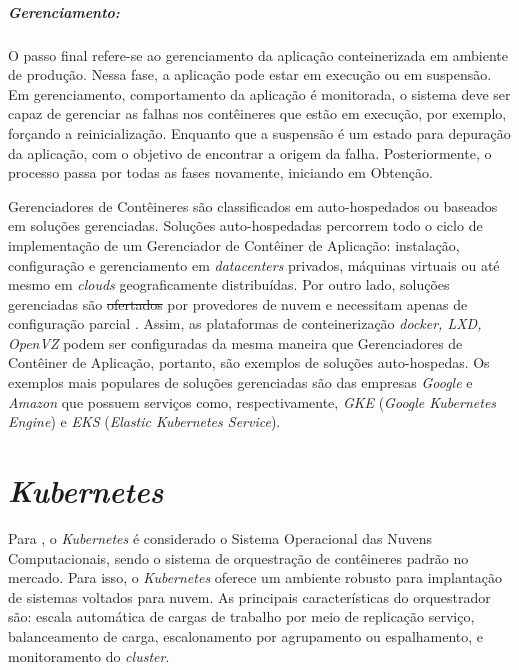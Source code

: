 \documentclass[
	12pt,				%
	openright,			%
	oneside,			%
	a4paper,			%
	brazil				%
	]{abntex2}
\providecommand{\DIFaddtex}[1]{{\protect\color{blue}\uwave{#1}}} %
\providecommand{\DIFdeltex}[1]{{\protect\color{red}\sout{#1}}}                      %
\providecommand{\DIFaddbegin}{} %
\providecommand{\DIFaddend}{} %
\providecommand{\DIFdelbegin}{} %
\providecommand{\DIFdelend}{} %
\providecommand{\DIFadd}[1]{\texorpdfstring{\DIFaddtex{#1}}{#1}} %
\providecommand{\DIFdel}[1]{\texorpdfstring{\DIFdeltex{#1}}{}} %
\newcommand{\DIFscaledelfig}{0.5}
\newlength{\DIFdelgraphicswidth} %
\newlength{\DIFdelgraphicsheight} %
\newcommand{\DIFaddincludegraphics}[2][]{{\color{blue}\fbox{\DIFOincludegraphics[#1]{#2}}}} %
\newcommand{\DIFdelincludegraphics}[2][]{%
\sbox{\DIFdelgraphicsbox}{\DIFOincludegraphics[#1]{#2}}%
\settoboxwidth{\DIFdelgraphicswidth}{\DIFdelgraphicsbox} %
\settoboxtotalheight{\DIFdelgraphicsheight}{\DIFdelgraphicsbox} %
\scalebox{\DIFscaledelfig}{%
\parbox[b]{\DIFdelgraphicswidth}{\usebox{\DIFdelgraphicsbox}\\[-\baselineskip] \rule{\DIFdelgraphicswidth}{0em}}\llap{\resizebox{\DIFdelgraphicswidth}{\DIFdelgraphicsheight}{%
\setlength{\unitlength}{\DIFdelgraphicswidth}%
\begin{picture}(1,1)%
\thicklines\linethickness{2pt} %
{\color[rgb]{1,0,0}\put(0,0){\framebox(1,1){}}}%
{\color[rgb]{1,0,0}\put(0,0){\line( 1,1){1}}}%
{\color[rgb]{1,0,0}\put(0,1){\line(1,-1){1}}}%
\end{picture}%
}\hspace*{3pt}}} %
} %
\DeclareRobustCommand{\DIFaddbegin}{\DIFOaddbegin \let\includegraphics\DIFaddincludegraphics} %
\DeclareRobustCommand{\DIFaddend}{\DIFOaddend \let\includegraphics\DIFOincludegraphics} %
\DeclareRobustCommand{\DIFdelbegin}{\DIFOdelbegin \let\includegraphics\DIFdelincludegraphics} %
\DeclareRobustCommand{\DIFdelend}{\DIFOaddend \let\includegraphics\DIFOincludegraphics} %
\begin{document}
\subparagraph{Gerenciamento:}
O passo final refere-se ao gerenciamento da aplicação conteinerizada em ambiente de produção. Nessa fase, a aplicação pode estar em execução ou em suspensão. Em gerenciamento, \DIFaddbegin \DIFadd{o }\DIFaddend comportamento da aplicação é monitorada, o sistema deve ser capaz de gerenciar as falhas nos contêineres que estão em execução, por exemplo, forçando a reinicialização. Enquanto que a suspensão é um estado para depuração da aplicação, com o objetivo de encontrar a origem da falha. Posteriormente, o processo passa por todas as fases novamente, iniciando em Obtenção.

Gerenciadores de Contêineres são classificados em auto-hospedados ou baseados em soluções gerenciadas. Soluções auto-hospedadas percorrem todo o ciclo de implementação de um Gerenciador de Contêiner de Aplicação: instalação, configuração e gerenciamento em \textit{datacenters} privados, máquinas virtuais ou até mesmo em \textit{clouds} geograficamente distribuídas. Por outro lado, soluções gerenciadas são \DIFdelbegin \DIFdel{ofertados }\DIFdelend \DIFaddbegin \DIFadd{ofertadas }\DIFaddend por provedores de nuvem e necessitam apenas de configuração parcial \cite{casalicchio2020state}. Assim, as plataformas de conteinerização \textit{docker, LXD, OpenVZ} podem ser configuradas da mesma maneira que Gerenciadores de Contêiner de Aplicação, portanto, são exemplos de soluções auto-hospedas. Os exemplos mais populares de soluções gerenciadas são das empresas \textit{Google} e \textit{Amazon} que possuem serviços como, respectivamente, \textit{GKE} (\textit{Google Kubernetes Engine}) e \textit{EKS} (\textit{Elastic Kubernetes Service}).

\section{\textit{Kubernetes}}
Para , o \textit{Kubernetes} é considerado o Sistema Operacional das Nuvens Computacionais, sendo o sistema de orquestração de contêineres padrão no mercado. Para isso, o \textit{Kubernetes} oferece um ambiente robusto para implantação de sistemas voltados para nuvem. As principais características do orquestrador são: escala automática de cargas de trabalho por meio de replicação serviço, balanceamento de carga, escalonamento por agrupamento ou espalhamento, e monitoramento do \textit{cluster}.
\end{document}
